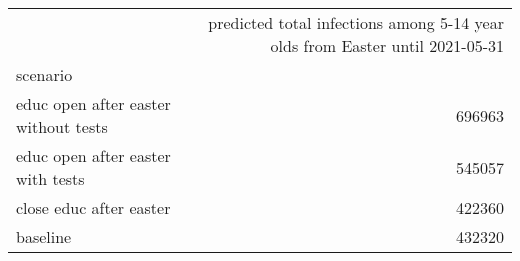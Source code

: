 \begin{tabular}{lr}
\toprule
{} &  predicted total infections among 5-14 year olds from Easter until 2021-05-31 \\
scenario                               &                                                                               \\
\midrule
 educ open after easter  without tests &                                             696963 \\
 educ open after easter  with tests    &                                             545057 \\
 close educ after easter               &                                             422360 \\
 baseline                              &                                             432320 \\
\bottomrule
\end{tabular}
